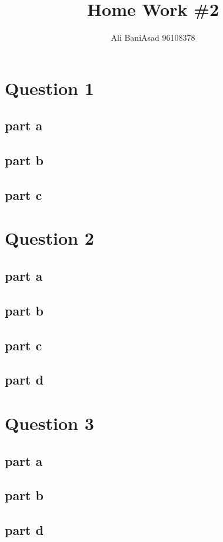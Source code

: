 \documentclass{article}
\title{Home Work \#2}
\author{Ali BaniAsad 96108378}
\begin{document}
	\maketitle
	\section{Question 1}
	
	\subsection{part a}
	
	\subsection{part b}\label{Q1_b}
	
	\subsection{part c}
	
	\section{Question 2}
	\subsection{part a}
	
	\subsection{part b}
	
	\subsection{part c}
	
	\subsection{part d}
	
	\section{Question 3}
	
	\subsection{part a}
	
	\subsection{part b}
	
	\subsection{part d}
	
	\newpage
	\tableofcontents
	\newpage
	\listoffigures
\end{document}

